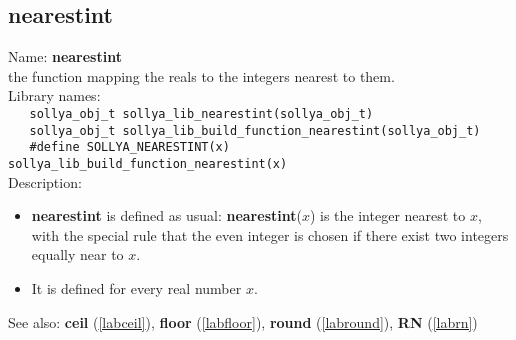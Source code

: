 \subsection{nearestint}
\label{labnearestint}
\noindent Name: \textbf{nearestint}\\
\phantom{aaa}the function mapping the reals to the integers nearest to them.\\[0.2cm]
\noindent Library names:\\
\verb|   sollya_obj_t sollya_lib_nearestint(sollya_obj_t)|\\
\verb|   sollya_obj_t sollya_lib_build_function_nearestint(sollya_obj_t)|\\
\verb|   #define SOLLYA_NEARESTINT(x) sollya_lib_build_function_nearestint(x)|\\[0.2cm]
\noindent Description: \begin{itemize}

\item \textbf{nearestint} is defined as usual: \textbf{nearestint}($x$) is the integer nearest to $x$, with the
   special rule that the even integer is chosen if there exist two integers equally near to $x$.

\item It is defined for every real number $x$.
\end{itemize}
See also: \textbf{ceil} (\ref{labceil}), \textbf{floor} (\ref{labfloor}), \textbf{round} (\ref{labround}), \textbf{RN} (\ref{labrn})
